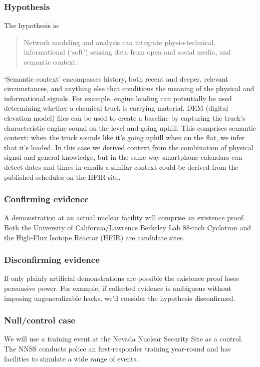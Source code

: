 \documentclass{article} %
\begin{document}
\subsubsection{Hypothesis}
The hypothesis is:
\begin{quote}
Network modeling and analysis can integrate physio-technical, informational (`soft') sensing data from open and social media, and semantic context.
\end{quote}

`Semantic context' encompasses history, both recent and deeper, relevant circumstances, and anything else that conditions the meaning of the physical and informational signals. For example, engine loading can potentially be used determining whether a chemical truck is carrying material. DEM (digital elevation model) files can be used to create a baseline by capturing the truck's characteristic engine sound on the level and going uphill. This comprises semantic context; when the truck sounds like it's going uphill when on the flat, we infer that it's loaded. In this case we derived context from the combination of physical signal and general knowledge, but in the same way smartphone calendars can detect dates and times in emails a similar context could be derived from the published schedules on the HFIR site.

\subsubsection{Confirming evidence}
A demonstration at an actual nuclear facility will comprise an existence proof. Both the University of California/Lawrence Berkeley Lab 88-inch Cyclotron and the High-Flux Isotope Reactor (HFIR) are candidate sites.

\subsubsection{Disconfirming evidence}
If only plainly artificial demonstrations are possible the existence proof loses persuasive power. For example, if collected evidence is ambiguous without imposing ungeneralizable hacks, we'd consider the hypothesis disconfirmed.

\subsubsection{Null/control case}
We will use a training event at the Nevada Nuclear Security Site as a control. The NNSS conducts police an first-responder training year-round and has facilities to simulate a wide range of events. 
\end{document}
